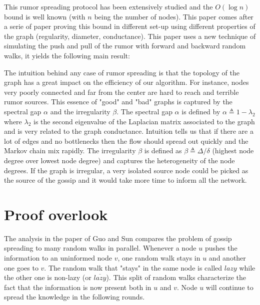 \documentclass[10pt,journal,a4paper]{IEEEtran}
\begin{document}
This rumor spreading protocol has been extensively studied and the $O(\log n)$ bound is well known (with $n$ being the number of nodes). This paper comes after a serie of paper proving this bound in different set-up using different properties of the graph (regularity, diameter, conductance). This paper uses a new technique of simulating the push and pull of the rumor with forward and backward random walks, it yields the following main result:

\vspace{.3cm}
\noindent{}
\vspace{.3cm}

The intuition behind any case of rumor spreading is that the topology of the graph has a great impact on the efficiency of our algorithm. For instance, nodes very poorly connected and far from the center are hard to reach and terrible rumor sources. This essence of "good" and "bad" graphs is captured by the spectral gap $\alpha$ and the irregularity $\beta$. The spectral gap $\alpha$ is defined by $\alpha \triangleq 1 - \lambda_2$ where $\lambda_2$ is the second eigenvalue of the Laplacian matrix associated to the graph \cite{jerrum} and is very related to the graph conductance. Intuition tells us that if there are a lot of edges and no bottlenecks then the flow should spread out quickly and the Markov chain mix rapidly. The irregularity $\beta$ is defined as $\beta \triangleq \Delta/\delta$ (highest node degree over lowest node degree) and captures the heterogeneity of the node degrees. If the graph is  irregular, a very isolated source node could be picked as the source of the gossip and it would take more time to inform all the network.

\section{Proof overlook}

The analysis in the paper of Guo and Sun \cite{guosun} compares the problem of gossip spreading to many random walks in parallel. Whenever a node $u$ pushes the information to an uninformed node $v$, one random walk stays in $u$ and another one goes to $v$. The random walk that "stays" in the same node is called $lazy$ while the other one is non-lazy (or $\overline{lazy}$). This split of random walks characterize the fact that the information is now present both in $u$ and $v$. Node $u$ will continue to spread the knowledge in the following rounds.
\end{document}
